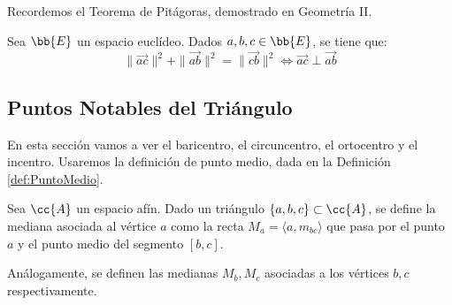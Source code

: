 Recordemos el Teorema de Pitágoras, demostrado en Geometría II.
\begin{teo}[de Pitágoras]
    Sea $\bb{E}$ un espacio euclídeo. Dados $a,b,c\in \bb{E}$, se tiene que:
    \begin{equation*}
        \|\vec{ac}\|^2 + \|\vec{ab}\|^2 = \|\vec{cb}\|^2 \Longleftrightarrow \vec{ac}\perp \vec{ab}
    \end{equation*}
    \begin{figure}[H]
        \centering
    \end{figure}
\end{teo}


\subsection{Puntos Notables del Triángulo}

En esta sección vamos a ver el baricentro, el circuncentro, el ortocentro y el incentro. Usaremos la definición de punto medio, dada en la Definición \ref{def:PuntoMedio}.

\begin{definicion}[Mediana]
    Sea $\cc{A}$ un espacio afín. Dado un triángulo $\{a,b,c\}\subset \cc{A}$, se define la mediana asociada al vértice $a$ como la recta $M_a=\langle a,m_{bc}\rangle$ que pasa por el punto $a$ y el punto medio del segmento $[b,c]$.

    Análogamente, se definen las medianas $M_b, M_c$ asociadas a los vértices $b,c$ respectivamente.
\end{definicion}

